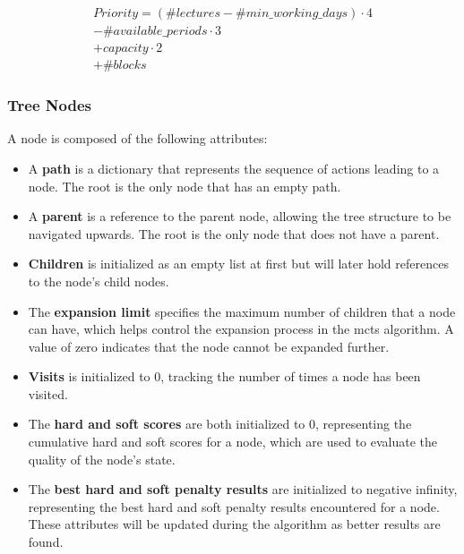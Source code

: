 \begin{equation}
  \begin{aligned}
	Priority = (\#lectures - \#min\_working\_days) \cdot 4 \\
	           - \#available\_periods \cdot 3 \\
	          + capacity \cdot 2 \\
	          + \#blocks\label{priority}
  \end{aligned}
\end{equation}

\subsubsection{Tree Nodes}

A node is composed of the following attributes:

\begin{itemize}
\item A \textbf{path} is a dictionary that represents the sequence of actions leading to a node. The root is the only node that has an empty path.

\item A \textbf{parent} is a reference to the parent node, allowing the tree structure to be navigated upwards. The root is the only node that does not have a parent.

\item \textbf{Children} is initialized as an empty list at first but will later hold references to the node's child nodes. 

\item The \textbf{expansion limit} specifies the maximum number of children that a node can have, which helps control the expansion process in the \ac{mcts} algorithm. A value of zero indicates that the node cannot be expanded further.

\item \textbf{Visits} is initialized to 0, tracking the number of times a node has been visited.

\item The \textbf{hard and soft scores} are both initialized to 0, representing the cumulative hard and soft scores for a node, which are used to evaluate the quality of the node's state.

\item The \textbf{best hard and soft penalty results} are initialized to negative infinity, representing the best hard and soft penalty results encountered for a node. These attributes will be updated during the algorithm as better results are found. 
\end{itemize}

